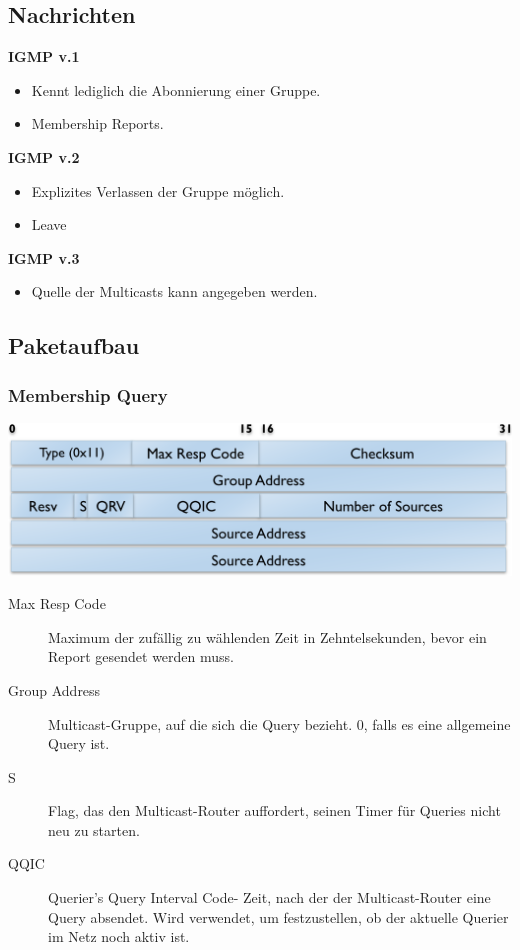 \documentclass{article} %
\begin{document}
\subsection{Nachrichten}
\textbf{IGMP v.1}
	\begin{itemize}
	\item Kennt lediglich die Abonnierung einer Gruppe. 
	\item Membership Reports. 
	\end{itemize}
\textbf{IGMP v.2}
	\begin{itemize}
	\item Explizites Verlassen der Gruppe möglich.
	\item Leave
	\end{itemize}
\textbf{IGMP v.3}
	\begin{itemize}
	\item Quelle der Multicasts kann angegeben werden. 
	\end{itemize}		
	
\subsection{Paketaufbau}
\subsubsection{Membership Query}
	\begin{center}
		\includegraphics[width=14cm]{img/igmpMQP.png}
	\end{center}
	\begin{description}
	\item[Max Resp Code] Maximum der zufällig zu wählenden Zeit in Zehntelsekunden, bevor ein Report gesendet werden muss. 
	\item[Group Address] Multicast-Gruppe, auf die sich die Query bezieht. 0, falls es eine allgemeine Query ist. 
	\item[S] Flag, das den Multicast-Router auffordert, seinen Timer für Queries nicht neu zu starten.
	\item[QQIC] \glqq Querier's Query Interval Code\grqq - Zeit, nach der der Multicast-Router eine Query absendet. Wird verwendet, um festzustellen, ob der aktuelle Querier im Netz noch aktiv ist. 	
	\end{description}
\end{document}
